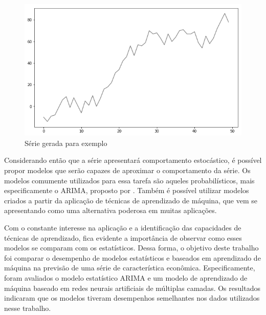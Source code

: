 \documentclass[
    12pt,
    oneside,
    a4paper,
    english,
    brazil
]{abntex2}
\begin{document}
\begin{figure}[ht]
    \centering
    \caption{Série gerada para exemplo}\label{serie0}
    \includegraphics[width=.5\linewidth]{images/serie_exemplo.png}
\end{figure}

Considerando  então  que  a  série  apresentará  comportamento  estocástico,  é
possível  propor  modelos  que  serão  capazes  de  aproximar  o  comportamento
da  série.  Os  modelos  comumente  utilizados para  essa  tarefa  são  aqueles
probabilísticos, mais especificamente o ARIMA\@, proposto por .
Também é possível utilizar modelos criados a partir da aplicação de técnicas de
aprendizado de máquina,  que vem se apresentando como  uma alternativa poderosa
em muitas aplicações.

Com o  constante interesse na  aplicação e  a identificação das  capacidades de
técnicas de  aprendizado, fica  evidente a importância  de observar  como esses
modelos se comparam com os estatísticos. Dessa forma, o objetivo deste trabalho
foi comparar o desempenho de modelos  estatísticos e baseados em aprendizado de
máquina na previsão de uma  série de característica econômica. Especificamente,
foram  avaliados  o  modelo  estatístico  ARIMA  e  um  modelo  de  aprendizado
de  máquina baseado  em  redes  neurais artificiais  de  múltiplas camadas.  Os
resultados indicaram que  os modelos tiveram desempenhos  semelhantes nos dados
utilizados nesse trabalho.



\end{document}
